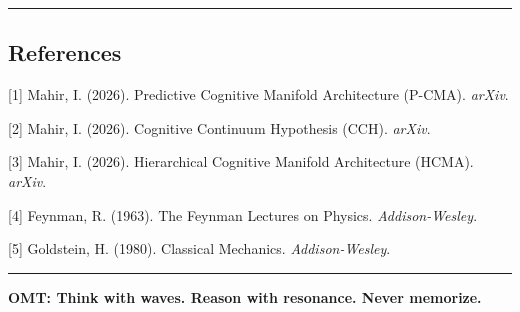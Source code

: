 \documentclass[
  11pt,
  a4paper,
]{article}
\begin{document}
\begin{center}\rule{0.5\linewidth}{0.5pt}\end{center}

\subsection{References}\label{references}

{[}1{]} Mahir, I. (2026). Predictive Cognitive Manifold Architecture
(P-CMA). \emph{arXiv}.

{[}2{]} Mahir, I. (2026). Cognitive Continuum Hypothesis (CCH).
\emph{arXiv}.

{[}3{]} Mahir, I. (2026). Hierarchical Cognitive Manifold Architecture
(HCMA). \emph{arXiv}.

{[}4{]} Feynman, R. (1963). The Feynman Lectures on Physics.
\emph{Addison-Wesley}.

{[}5{]} Goldstein, H. (1980). Classical Mechanics.
\emph{Addison-Wesley}.

\begin{center}\rule{0.5\linewidth}{0.5pt}\end{center}

\textbf{OMT: Think with waves. Reason with resonance. Never memorize.}
\end{document}

